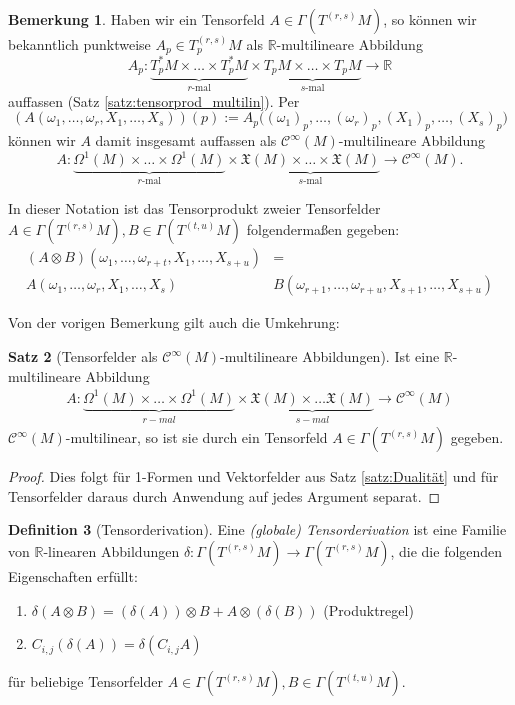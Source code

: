 \documentclass[a4paper]{scrreprt}
\numberwithin{equation}{chapter}
\newcommand{\R}{\mathbb{R}}
\newcommand{\sC}{\mathcal{C}^{\infty}}
\newcommand{\vf}{\mathfrak{X}}
\theoremstyle{definition}
\newtheorem{defn}{Definition}[section]
\newtheorem{satz}[defn]{Satz}
\newtheorem{bem}[defn]{Bemerkung}
\begin{document}
		\begin{bem}\label{bem:Tensorprodukt_mulitilin}
			Haben wir ein Tensorfeld $A \in \Gamma(T^{(r,s)}M)$, so können wir bekanntlich punktweise $A_p \in T^{(r,s)}_pM$ als $\R$-multilineare Abbildung
			\[A_p\colon \underbrace{T_p^*M \times \dots \times T_p^*M}_\text{$r$-mal} \times \underbrace{T_pM \times \dots \times T_pM}_\text{$s$-mal} \to \R\]
			auffassen (Satz \ref{satz:tensorprod_multilin}). Per
			\[(A(\omega_1,\dots,\omega_r, X_1,\dots,X_s))(p) := A_p\Big((\omega_1)_p,\dots,(\omega_r)_p, (X_1)_p,\dots,(X_s)_p\Big)\]
			können wir $A$ damit insgesamt auffassen als $\sC(M)$-multilineare Abbildung
			\[A\colon \underbrace{\Omega^1(M) \times \dots \times \Omega^1(M)}_\text{$r$-mal} \times \underbrace{\vf(M) \times \dots \times \vf(M)}_\text{$s$-mal} \to \sC(M).\]
			
			In dieser Notation ist das Tensorprodukt zweier Tensorfelder $A\in\Gamma(T^{(r,s)}M), B\in \Gamma(T^{(t,u)}M)$ folgendermaßen gegeben:
			\begin{align*}
				(A\otimes B)(\omega_1,\ldots,\omega_{r+t},X_1,\ldots,X_{s+u})&=\\
				A(\omega_1,\ldots,\omega_r,X_1,\ldots,X_s) &B(\omega_{r+1},\ldots,\omega_{r+u},X_{s+1},\ldots,X_{s+u})
			\end{align*}
		\end{bem}
		Von der vorigen Bemerkung gilt auch die Umkehrung:
		\begin{satz}[Tensorfelder als $\sC(M)$-multilineare Abbildungen]
			Ist eine $\R$-multilineare Abbildung
			\begin{align*}
				A\colon \underbrace{\Omega^1(M)\times\dots\times\Omega^1(M)}_{r-mal}\times\underbrace{\vf(M)\times\dots\vf(M)}_{s-mal}\rightarrow \sC(M)
			\end{align*}
			$\sC(M)$-multilinear, so ist sie durch ein Tensorfeld $A \in \Gamma(T^{(r,s)}M)$ gegeben.
			\begin{proof}
				Dies folgt für 1-Formen und Vektorfelder aus Satz \ref{satz:Dualität} und für Tensorfelder daraus durch Anwendung \glqq auf jedes Argument separat\grqq .
			\end{proof}
		\end{satz}
		
		\begin{defn}[Tensorderivation]
			Eine \emph{(globale) Tensorderivation} ist eine Familie von $\R$-linearen Abbildungen $\delta\colon\Gamma(T^{(r,s)}M)\rightarrow \Gamma(T^{(r,s)}M)$, die die folgenden Eigenschaften erfüllt:
			\begin{enumerate}[label=\arabic*.]
				\item $\delta (A\otimes B)=(\delta(A))\otimes B+A\otimes(\delta(B))$ (Produktregel)
				\item $C_{i,j}(\delta(A))=\delta(C_{i,j}A)$ 
			\end{enumerate}
			für beliebige Tensorfelder $A\in \Gamma(T^{(r,s)}M), B\in\Gamma(T^{(t,u)}M)$.
		\end{defn}
		
\end{document}
